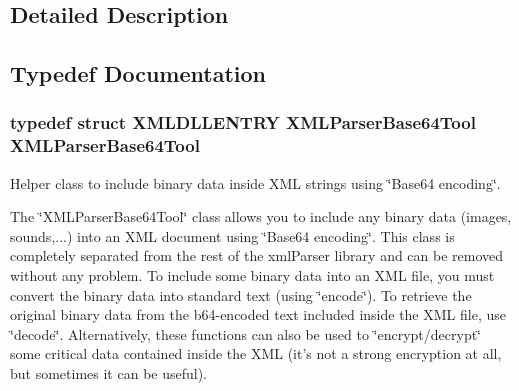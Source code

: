 \subsection{Detailed Description}


\subsection{Typedef Documentation}
\hypertarget{group__XMLParserBase64Tool_ga90d0646ff4a054f9d8ea0d29fb86f3a9}{
\subsubsection[{X\-M\-L\-Parser\-Base64\-Tool}]{\setlength{\rightskip}{0pt plus 5cm}typedef struct {\bf X\-M\-L\-D\-L\-L\-E\-N\-T\-R\-Y} {\bf X\-M\-L\-Parser\-Base64\-Tool} {\bf X\-M\-L\-Parser\-Base64\-Tool}}}\label{group__XMLParserBase64Tool_ga90d0646ff4a054f9d8ea0d29fb86f3a9}


Helper class to include binary data inside X\-M\-L strings using \char`\"{}\-Base64 encoding\char`\"{}. 

The \char`\"{}\-X\-M\-L\-Parser\-Base64\-Tool\char`\"{} class allows you to include any binary data (images, sounds,...) into an X\-M\-L document using \char`\"{}\-Base64 encoding\char`\"{}. This class is completely separated from the rest of the xml\-Parser library and can be removed without any problem. To include some binary data into an X\-M\-L file, you must convert the binary data into standard text (using \char`\"{}encode\char`\"{}). To retrieve the original binary data from the b64-\/encoded text included inside the X\-M\-L file, use \char`\"{}decode\char`\"{}. Alternatively, these functions can also be used to \char`\"{}encrypt/decrypt\char`\"{} some critical data contained inside the X\-M\-L (it's not a strong encryption at all, but sometimes it can be useful). 